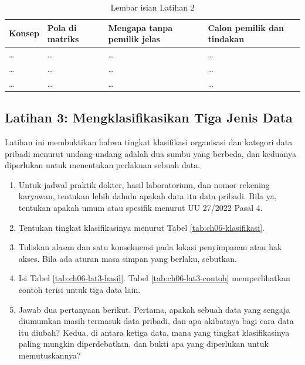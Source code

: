 \begin{table}[!htb]
  \centering
  \caption{Lembar isian Latihan 2}
  \label{tab:ch06-lat2-hasil}
  \begin{tabularx}{\textwidth}{lXXX}
    \hline
    \textbf{Konsep} & \textbf{Pola di matriks} & \textbf{Mengapa tanpa pemilik
      jelas} & \textbf{Calon pemilik dan tindakan} \\
    \hline
    \dots & \dots & \dots & \dots \\
    \hline
    \dots & \dots & \dots & \dots \\
    \hline
    \dots & \dots & \dots & \dots \\
    \hline
  \end{tabularx}
\end{table}

\subsection*{Latihan 3: Mengklasifikasikan Tiga Jenis Data}

Latihan ini membuktikan bahwa tingkat klasifikasi organisasi dan kategori data
pribadi menurut undang-undang adalah dua sumbu yang berbeda, dan keduanya
diperlukan untuk menentukan perlakuan sebuah data.

\begin{enumerate}
  \item Untuk jadwal praktik dokter, hasil laboratorium, dan nomor rekening
        karyawan, tentukan lebih dahulu apakah data itu data pribadi. Bila ya,
        tentukan apakah umum atau spesifik menurut UU 27/2022 Pasal 4.
  \item Tentukan tingkat klasifikasinya menurut Tabel \ref{tab:ch06-klasifikasi}.
  \item Tuliskan alasan dan satu konsekuensi pada lokasi penyimpanan atau hak
        akses. Bila ada aturan masa simpan yang berlaku, sebutkan.
  \item Isi Tabel \ref{tab:ch06-lat3-hasil}. Tabel \ref{tab:ch06-lat3-contoh}
        memperlihatkan contoh terisi untuk tiga data lain.
  \item Jawab dua pertanyaan berikut. Pertama, apakah sebuah data yang sengaja
        diumumkan masih termasuk data pribadi, dan apa akibatnya bagi cara
        data itu diubah? Kedua, di antara ketiga data, mana yang tingkat
        klasifikasinya paling mungkin diperdebatkan, dan bukti apa yang
        diperlukan untuk memutuskannya?
\end{enumerate}

